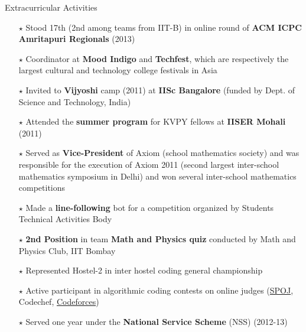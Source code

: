 \documentclass{resume2} %
\begin{document}
\vspace{2.17cm}

\begin{rSection}{Extracurricular Activities}
\begin{itemize}[leftmargin=*]
\item[$\star$] Stood 17th (2nd among teams from IIT-B) in online round of \textbf{ACM ICPC Amritapuri Regionals} (2013)
\item[$\star$] Coordinator at \textbf{Mood Indigo} and \textbf{Techfest}, which are respectively the largest cultural and technology college festivals in Asia 
\item[$\star$] Invited to \textbf{Vijyoshi} camp (2011) at \textbf{IISc Bangalore} (funded by Dept. of Science and Technology, India)
\item[$\star$] Attended the \textbf{summer program} for KVPY fellows at \textbf{IISER Mohali} (2011)
\item[$\star$] Served as \textbf{Vice-President} of Axiom (school mathematics society) and was responsible for the execution of Axiom 2011 (second largest inter-school mathematics symposium in Delhi) and won several inter-school mathematics competitions
\item[$\star$] Made a \textbf{line-following} bot for a competition organized by Students Technical Activities Body
\item[$\star$] \textbf{2nd Position} in team \textbf{Math and Physics quiz} conducted by Math and Physics Club, IIT Bombay
\item[$\star$] Represented Hostel-2 in inter hostel coding general championship
\item[$\star$] Active participant in algorithmic coding contests on online judges (\href{http://spoj.com/users/pratyaksh}{SPOJ}, Codechef, \href{codeforces.com/profile/pratyaksh}{Codeforces})
\item[$\star$] Served one year under the \textbf{National Service Scheme} (NSS) (2012-13)
\end{itemize}
\end{rSection}
\end{document}
